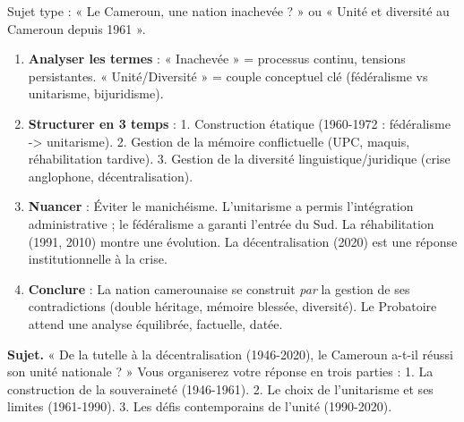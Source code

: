 \documentclass[11pt]{article}
\begin{document}
\begin{methode}
Sujet type : « Le Cameroun, une nation inachevée ? » ou « Unité et diversité au Cameroun depuis 1961 ».
\begin{enumerate}
\item \textbf{Analyser les termes} : « Inachevée » = processus continu, tensions persistantes. « Unité/Diversité » = couple conceptuel clé (fédéralisme vs unitarisme, bijuridisme).
\item \textbf{Structurer en 3 temps} : 1. Construction étatique (1960-1972 : fédéralisme -> unitarisme). 2. Gestion de la mémoire conflictuelle (UPC, maquis, réhabilitation tardive). 3. Gestion de la diversité linguistique/juridique (crise anglophone, décentralisation).
\item \textbf{Nuancer} : Éviter le manichéisme. L'unitarisme a permis l'intégration administrative ; le fédéralisme a garanti l'entrée du Sud. La réhabilitation (1991, 2010) montre une évolution. La décentralisation (2020) est une réponse institutionnelle à la crise.
\item \textbf{Conclure} : La nation camerounaise se construit \emph{par} la gestion de ses contradictions (double héritage, mémoire blessée, diversité). Le Probatoire attend une analyse équilibrée, factuelle, datée.
\end{enumerate}
\end{methode}

\begin{exercice}
\textbf{Sujet.} « De la tutelle à la décentralisation (1946-2020), le Cameroun a-t-il réussi son unité nationale ? » Vous organiserez votre réponse en trois parties : 1. La construction de la souveraineté (1946-1961). 2. Le choix de l'unitarisme et ses limites (1961-1990). 3. Les défis contemporains de l'unité (1990-2020).
\end{exercice}
\end{document}
